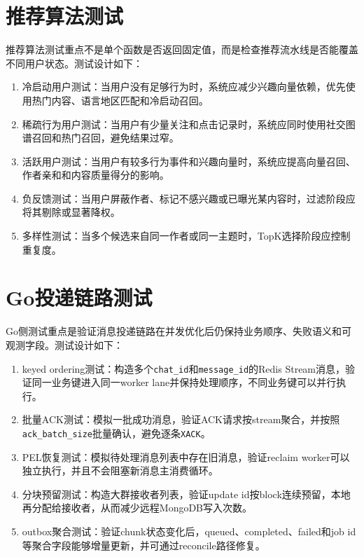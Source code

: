 \section{推荐算法测试}

推荐算法测试重点不是单个函数是否返回固定值，而是检查推荐流水线是否能覆盖不同用户状态。测试设计如下：

\begin{enumerate}
  \item 冷启动用户测试：当用户没有足够行为时，系统应减少兴趣向量依赖，优先使用热门内容、语言地区匹配和冷启动召回。
  \item 稀疏行为用户测试：当用户有少量关注和点击记录时，系统应同时使用社交图谱召回和热门召回，避免结果过窄。
  \item 活跃用户测试：当用户有较多行为事件和兴趣向量时，系统应提高向量召回、作者亲和和内容质量得分的影响。
  \item 负反馈测试：当用户屏蔽作者、标记不感兴趣或已曝光某内容时，过滤阶段应将其剔除或显著降权。
  \item 多样性测试：当多个候选来自同一作者或同一主题时，TopK选择阶段应控制重复度。
\end{enumerate}

\section{Go投递链路测试}

Go侧测试重点是验证消息投递链路在并发优化后仍保持业务顺序、失败语义和可观测字段。测试设计如下：

\begin{enumerate}
  \item keyed ordering测试：构造多个\texttt{chat\_id}和\texttt{message\_id}的Redis Stream消息，验证同一业务键进入同一worker lane并保持处理顺序，不同业务键可以并行执行。
  \item 批量ACK测试：模拟一批成功消息，验证ACK请求按stream聚合，并按照\texttt{ack\_batch\_size}批量确认，避免逐条\texttt{XACK}。
  \item PEL恢复测试：模拟待处理消息列表中存在旧消息，验证reclaim worker可以独立执行，并且不会阻塞新消息主消费循环。
  \item 分块预留测试：构造大群接收者列表，验证update id按block连续预留，本地再分配给接收者，从而减少远程MongoDB写入次数。
  \item outbox聚合测试：验证chunk状态变化后，queued、completed、failed和job id等聚合字段能够增量更新，并可通过reconcile路径修复。
\end{enumerate}


